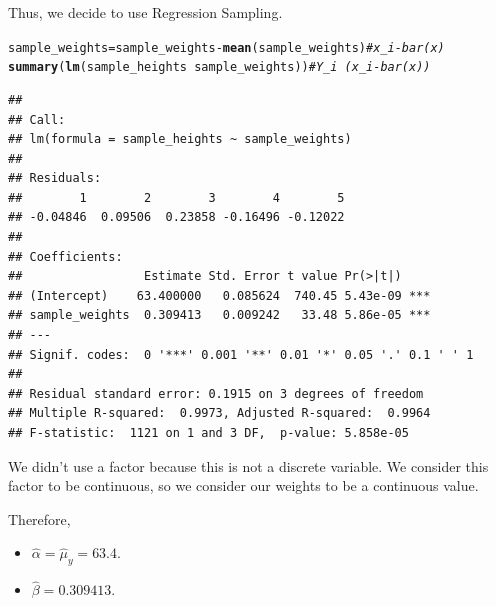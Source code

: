 \documentclass[oneside]{book}\usepackage[]{graphicx}\usepackage[dvipsnames,table,xcdraw]{xcolor}
\makeatletter
\newcommand{\hlcom}[1]{\textcolor[rgb]{0.678,0.584,0.686}{\textit{#1}}}%
\newcommand{\hlopt}[1]{\textcolor[rgb]{0,0,0}{#1}}%
\newcommand{\hlstd}[1]{\textcolor[rgb]{0.345,0.345,0.345}{#1}}%
\newcommand{\hlkwb}[1]{\textcolor[rgb]{0.69,0.353,0.396}{#1}}%
\newcommand{\hlkwd}[1]{\textcolor[rgb]{0.737,0.353,0.396}{\textbf{#1}}}%
\newenvironment{kframe}{%
 \def\at@end@of@kframe{}%
 \ifinner\ifhmode%
  \def\at@end@of@kframe{\end{minipage}}%
  \begin{minipage}{\columnwidth}%
 \fi\fi%
 \def\FrameCommand##1{\hskip\@totalleftmargin \hskip-\fboxsep
 \colorbox{shadecolor}{##1}\hskip-\fboxsep
     \hskip-\linewidth \hskip-\@totalleftmargin \hskip\columnwidth}%
 \MakeFramed {\advance\hsize-\width
   \@totalleftmargin\z@ \linewidth\hsize
   \@setminipage}}%
 {\par\unskip\endMakeFramed%
 \at@end@of@kframe}
\newenvironment{knitrout}{}{} %
\makeatother
\begin{document}
Thus, we decide to use Regression Sampling.

\begin{knitrout}
\color{fgcolor}\begin{kframe}
\begin{alltt}
\hlstd{sample_weights} \hlkwb{=} \hlstd{sample_weights} \hlopt{-} \hlkwd{mean}\hlstd{(sample_weights)}  \hlcom{# x_i - bar(x)}
\hlkwd{summary}\hlstd{(}\hlkwd{lm}\hlstd{(sample_heights} \hlopt{~} \hlstd{sample_weights))}  \hlcom{# Y_i ~ (x_i - bar(x))}
\end{alltt}
\begin{verbatim}
## 
## Call:
## lm(formula = sample_heights ~ sample_weights)
## 
## Residuals:
##        1        2        3        4        5 
## -0.04846  0.09506  0.23858 -0.16496 -0.12022 
## 
## Coefficients:
##                 Estimate Std. Error t value Pr(>|t|)    
## (Intercept)    63.400000   0.085624  740.45 5.43e-09 ***
## sample_weights  0.309413   0.009242   33.48 5.86e-05 ***
## ---
## Signif. codes:  0 '***' 0.001 '**' 0.01 '*' 0.05 '.' 0.1 ' ' 1
## 
## Residual standard error: 0.1915 on 3 degrees of freedom
## Multiple R-squared:  0.9973,	Adjusted R-squared:  0.9964 
## F-statistic:  1121 on 1 and 3 DF,  p-value: 5.858e-05
\end{verbatim}
\end{kframe}
\end{knitrout}
We didn't use a factor because this is not a discrete variable.
We consider this factor to be continuous, so we consider our weights to be a continuous value.

Therefore,

\begin{itemize}
    \item $\hat{\alpha}=\hat{\mu}_y=63.4$.
    \item $\hat{\beta}=0.309413$.
\end{itemize}
\end{document}
